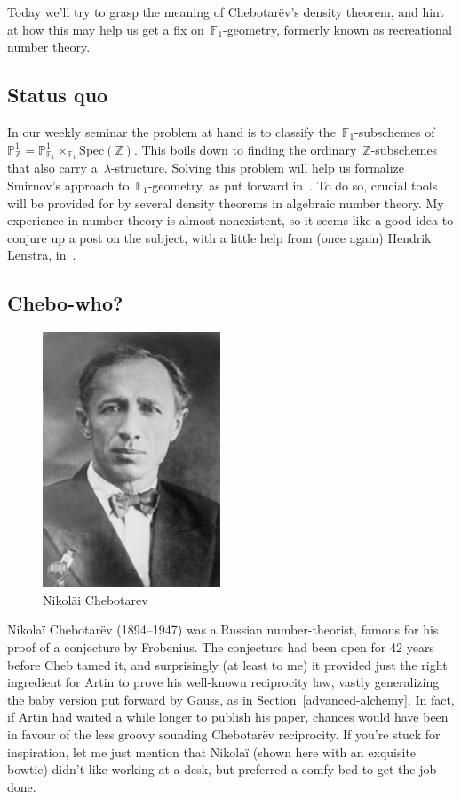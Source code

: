 Today we'll try to grasp the meaning of Chebotar\"ev's density theorem, and hint at how this may help us get a fix on~$\mathbb{F}_{1}$-geometry, formerly known as recreational number theory.

\subsection{Status quo}

In our weekly seminar the problem at hand is to classify the~$\mathbb{F}_{1}$-subschemes of~$\mathbb{P}^{1}_{\mathbb{Z}}=\mathbb{P}^{1}_{\mathbb{F}_{1}}\times_{\mathbb{F}_{1}}\mathrm{Spec}(\mathbb{Z})$. This boils down to finding the ordinary~$\mathbb{Z}$-subschemes that also carry a~$\lambda$-structure. Solving this problem will help us formalize Smirnov's approach to~$\mathbb{F}_{1}$-geometry, as put forward in~\cite{hurwitz-inequalities-for-number-fields}. To do so, crucial tools will be provided for by several density theorems in algebraic number theory. My experience in number theory is almost nonexistent, so it seems like a good idea to conjure up a post on the subject, with a little help from (once again) Hendrik Lenstra, in~\cite{chebotarev-and-his-density-theorem}.

\subsection{Chebo-who?}

\begin{figure}
  \centering
  \includegraphics[width=.3\textwidth]{chebotarev-density/chebotarev}
  \caption{Nikol\"ai Chebotarev}
\end{figure}

Nikola\"i Chebotar\"ev (1894--1947) was a Russian number-theorist, famous for his proof of a conjecture by Frobenius. The conjecture had been open for 42 years before Cheb tamed it, and surprisingly (at least to me) it provided just the right ingredient for Artin to prove his well-known reciprocity law, vastly generalizing the baby version put forward by Gauss, as in Section~\ref{advanced-alchemy}. In fact, if Artin had waited a while longer to publish his paper, chances would have been in favour of the less groovy sounding Chebotar\"ev reciprocity. If you're stuck for inspiration, let me just mention that Nikola\"i (shown here with an exquisite bowtie) didn't like working at a desk, but preferred a comfy bed to get the job done.

